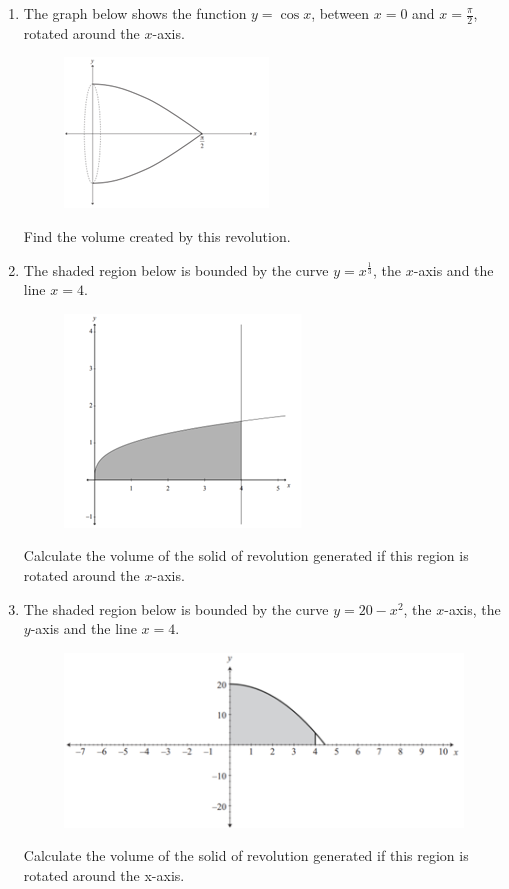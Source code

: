 \documentclass[../main.tex]{subfiles}
\begin{document}
\label{Volumes of revolution}
\begin{enumerate}[itemsep=0.5cm]
    \item 
    The graph below shows the function $y=\cos{x}$, between $x=0$ and $x=\frac{\pi}{2}$, rotated around the $x$-axis.
    \begin{figure}[h]
        \centering
        \includegraphics{images/volrev8.png}
    \end{figure}
    Find the volume created by this revolution.

    \item 
    The shaded region below is bounded by the curve $y=x^{\frac{1}{3}}$, the $x$-axis and the line $x=4$.
    \begin{figure}[h]
        \centering
        \includegraphics[width=0.3\linewidth]{images/volrev9.png}
    \end{figure}

    Calculate the volume of the solid of revolution generated if this region is rotated around the $x$-axis.

    \item
    The shaded region below is bounded by the curve $y=20-x^2$, the $x$-axis, the $y$-axis and the line $x=4$.
    \begin{figure}[h]
        \centering
        \includegraphics[width=0.4\linewidth]{images/volrev11.png}
    \end{figure}

    Calculate the volume of the solid of revolution generated if this region is rotated around the x-axis.


\end{enumerate}
\end{document}
